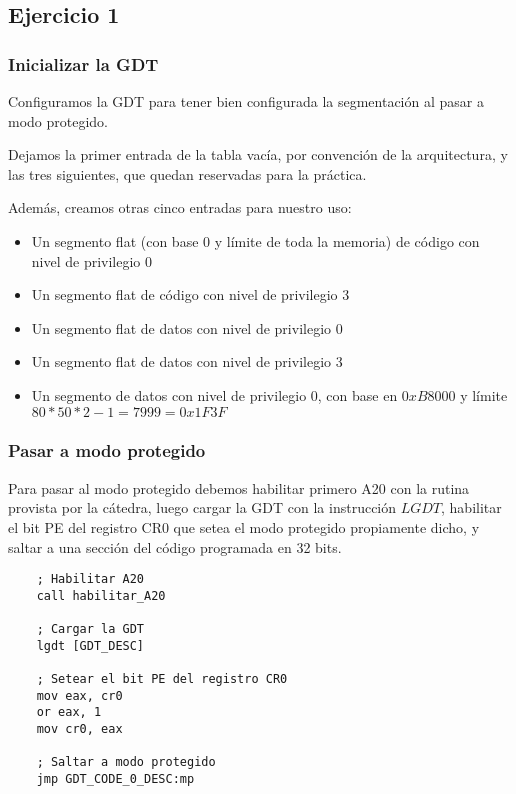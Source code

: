 \subsection{Ejercicio 1}

\subsubsection{Inicializar la GDT}

Configuramos la GDT para tener bien configurada la segmentación al pasar a modo protegido.

Dejamos la primer entrada de la tabla vacía, por convención de la arquitectura, y las tres siguientes, que quedan reservadas para la práctica.

Además, creamos otras cinco entradas para nuestro uso:

\begin{itemize}
    \item Un segmento flat (con base 0 y límite de toda la memoria) de código con nivel de privilegio 0
    \item Un segmento flat de código con nivel de privilegio 3
    \item Un segmento flat de datos con nivel de privilegio 0
    \item Un segmento flat de datos con nivel de privilegio 3
    \item Un segmento de datos con nivel de privilegio 0, con base en $0xB8000$ y límite $80 * 50 * 2 - 1 = 7999 = 0x1F3F$
\end{itemize}

\subsubsection{Pasar a modo protegido}

Para pasar al modo protegido debemos habilitar primero A20 con la rutina provista por la cátedra, luego cargar la GDT con la instrucción $LGDT$, habilitar el bit PE del registro CR0 que setea el modo protegido propiamente dicho, y saltar a una sección del código programada en 32 bits.

\begin{lstlisting}
    ; Habilitar A20
    call habilitar_A20

    ; Cargar la GDT
    lgdt [GDT_DESC]

    ; Setear el bit PE del registro CR0
    mov eax, cr0
    or eax, 1
    mov cr0, eax

    ; Saltar a modo protegido
    jmp GDT_CODE_0_DESC:mp
\end{lstlisting}

